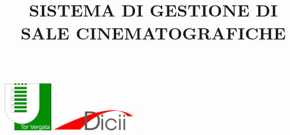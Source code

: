 \documentclass[12pt]{article}
\title{\uppercase{Sistema di gestione di sale cinematografiche}}
\begin{document}
\includegraphics[width=2.1cm, valign=t]{image1}
\hfill
\includegraphics[width=3.55cm, valign=t]{image2}
{\let\newpage\relax\maketitle}
\tableofcontents





\appendix

\end{document}
